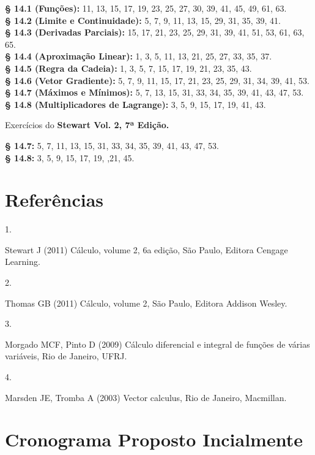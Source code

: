 \documentclass[
  letterpaper,
  DIV=11,
  numbers=noendperiod]{scrartcl}
\newlength{\cslhangindent}
\newlength{\csllabelwidth}
\newenvironment{CSLReferences}[2] %
 {\begin{list}{}{%
  \setlength{\itemindent}{0pt}
  \setlength{\leftmargin}{0pt}
  \setlength{\parsep}{0pt}
  \ifodd #1
   \setlength{\leftmargin}{\cslhangindent}
   \setlength{\itemindent}{-1\cslhangindent}
  \fi
  \setlength{\itemsep}{#2\baselineskip}}}
 {\end{list}}
\newcommand{\CSLLeftMargin}[1]{\parbox[t]{\csllabelwidth}{\strut#1\strut}}
\newcommand{\CSLRightInline}[1]{\parbox[t]{\linewidth - \csllabelwidth}{\strut#1\strut}}
\begin{document}
\textbf{§ 14.1 (Funções):} 11, 13, 15, 17, 19, 23, 25, 27, 30, 39, 41,
45, 49, 61, 63.\\
\textbf{§ 14.2 (Limite e Continuidade):} 5, 7, 9, 11, 13, 15, 29, 31,
35, 39, 41.\\
\textbf{§ 14.3 (Derivadas Parciais):} 15, 17, 21, 23, 25, 29, 31, 39,
41, 51, 53, 61, 63, 65.\\
\textbf{§ 14.4 (Aproximação Linear):} 1, 3, 5, 11, 13, 21, 25, 27, 33,
35, 37.\\
\textbf{§ 14.5 (Regra da Cadeia):} 1, 3, 5, 7, 15, 17, 19, 21, 23, 35,
43.\\
\textbf{§ 14.6 (Vetor Gradiente):} 5, 7, 9, 11, 15, 17, 21, 23, 25, 29,
31, 34, 39, 41, 53.\\
\textbf{§ 14.7 (Máximos e Mínimos):} 5, 7, 13, 15, 31, 33, 34, 35, 39,
41, 43, 47, 53.\\
\textbf{§ 14.8 (Multiplicadores de Lagrange):} 3, 5, 9, 15, 17, 19, 41,
43.

Exercícios do \textbf{Stewart Vol. 2, 7ª Edição.}

\textbf{§ 14.7:} 5, 7, 11, 13, 15, 31, 33, 34, 35, 39, 41, 43, 47, 53.\\
\textbf{§ 14.8:} 3, 5, 9, 15, 17, 19, ,21, 45.

\section{Referências}\label{sec-ref}

\protect{}\label{refs}
\begin{CSLReferences}{0}{0}
\CSLLeftMargin{1. }%
\CSLRightInline{Stewart J (2011) C{á}lculo, volume 2, 6a edi{ç}{ã}o, São
Paulo, Editora Cengage Learning.}

\CSLLeftMargin{2. }%
\CSLRightInline{Thomas GB (2011) C{á}lculo, volume 2, São Paulo, Editora
Addison Wesley.}

\CSLLeftMargin{3. }%
\CSLRightInline{Morgado MCF, Pinto D (2009) Cálculo diferencial e
integral de funções de várias variáveis, Rio de Janeiro, UFRJ.}

\CSLLeftMargin{4. }%
\CSLRightInline{Marsden JE, Tromba A (2003) Vector calculus, Rio de
Janeiro, Macmillan.}

\end{CSLReferences}

\section{Cronograma Proposto
Incialmente}\label{cronograma-proposto-incialmente}
\end{document}

